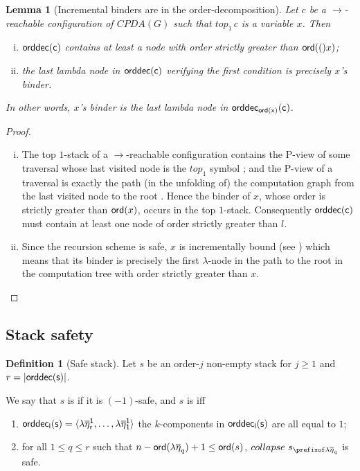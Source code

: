 \documentclass[a4paper]{article}
\newtheorem{lemma}{Lemma}[section]
\theoremstyle{remark}
\theoremstyle{definition}
\newtheorem{definition}{Definition}[section]
\newcommand\orddec{\sf orddec}
\begin{document}
\begin{lemma}[Incremental binders are in the order-decomposition]
\label{lem:binder_in_ordecompos} Let $c$ be a $\rightarrow$-reachable
configuration of $CPDA(G)$ such that $top_1\,c$ is a variable $x$. Then
\begin{enumerate}[i.]
\item $\orddec(c)$ contains at least a node with order strictly greater than ${\sf ord}(()x)$;
\item the last lambda node in $\orddec(c)$ verifying the first condition is precisely $x$'s binder.
\end{enumerate}
In other words, $x$'s binder is the last lambda node in $\orddec_{\ord x}(c)$.
\end{lemma}
\begin{proof}
\begin{enumerate}[i.]
\item The top $1$-stack of a $\rightarrow$-reachable configuration contains the P-view of some traversal whose last visited node is the $top_1$ symbol \cite[Corollary 8]{hague-collaps-full}; and
    the P-view of a traversal is exactly the path (in the unfolding of) the
    computation graph from the last visited node to
    the root \cite[Proposition 6]{OngLics2006}. Hence the binder of $x$, whose order
    is strictly greater than ${\sf ord}(x)$, occurs in the top $1$-stack.
    Consequently $\orddec(c)$ must contain at least one node of order strictly greater than $l$.

\item Since the recursion scheme is safe, $x$ is
 incrementally bound (see \cite{blumong:safelambdacalculus})
 which means that its binder is precisely the first $\lambda$-node in the
 path to the root in the computation tree with order strictly
 greater than $x$. \qedhere
\end{enumerate}
\end{proof}

\subsection{Stack safety}

\begin{definition}[Safe stack]
\label{dfn:safestack} Let $s$ be an order-$j$ non-empty stack for $j\geq1$ and $r
= |\orddec(s)|$.

We say that $s$ is  if it is $(-1)$-safe,
and $s$ is  iff
    \begin{enumerate}[1.]
    \item $\orddec_l(s) = \langle \lambda \overline\eta_r^1, \ldots ,
    \lambda \overline{\eta}_1^1 \rangle$ \ie the $k$-components in $\orddec_l(s)$ are all equal to $1$;

    \item for all $1 \leq q \leq r$ such that $n-{\sf ord}(\lambda \overline\eta_q)+1 \leq {\sf ord}(s)$,
    $collapse~s_{\prefixof \lambda\overline\eta_q}$ is safe.
    \end{enumerate}

\end{definition}
\end{document}
